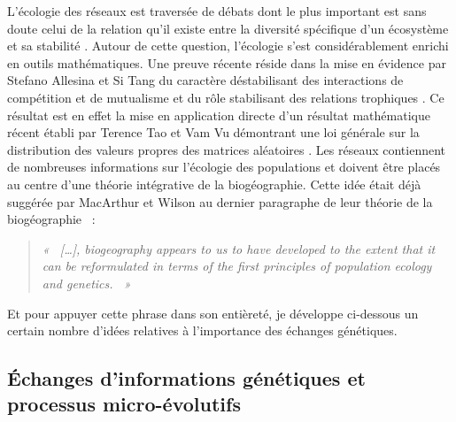 L'écologie des réseaux est traversée de débats dont le plus important
est sans doute celui de la relation qu'il existe entre la diversité
spécifique d'un écosystème et sa stabilité \citep{May1973, McCann2000}.
Autour de cette question, l'écologie s'est considérablement enrichi en
outils mathématiques. Une preuve récente réside dans la mise en évidence
par Stefano Allesina et Si Tang du caractère déstabilisant des
interactions de compétition et de mutualisme et du rôle stabilisant des
relations trophiques \citep{Allesina2012a}. Ce résultat est en effet la
mise en application directe d'un résultat mathématique récent établi par
Terence Tao et Vam Vu démontrant une loi générale sur la distribution
des valeurs propres des matrices aléatoires \citep{Tao2010}. Les réseaux
contiennent de nombreuses informations sur l'écologie des populations et
doivent être placés au centre d'une théorie intégrative de la
biogéographie. Cette idée était déjà suggérée par MacArthur et Wilson au
dernier paragraphe de leur théorie de la biogéographie
\citep{MacArthur1967}~:

\begin{quote}
\emph{«~ {[}\ldots{}{]}, biogeography appears to us to have developed to
the extent that it can be reformulated in terms of the first principles
of population ecology and genetics. ~»}
\end{quote}

Et pour appuyer cette phrase dans son entièreté, je développe ci-dessous
un certain nombre d'idées relatives à l'importance des échanges
génétiques.

\subsection*{Échanges d'informations génétiques et processus
micro-évolutifs}\label{uxe9changes-dinformations-guxe9nuxe9tiques-et-processus-micro-uxe9volutifs}

